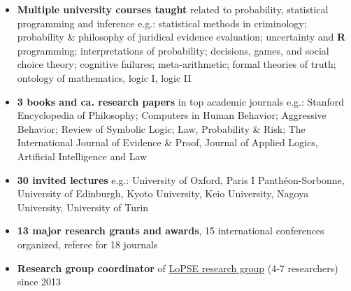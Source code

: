 \documentclass[10pt, a4paper]{article}
\begin{document}
\vspace{-6mm}

\begin{itemize}[leftmargin=*]
	 \setlength{\itemsep}{0pt}\scriptsize
	\item \normalsize  \textbf{Multiple university courses taught} related to probability, statistical programming and inference
	\newline
	\scriptsize e.g.: statistical methods in criminology; probability \& philosophy of juridical evidence evaluation; uncertainty and \textbf{\textsf{R}} programming; interpretations of probability; decisions, games, and social choice theory; cognitive failures; meta-arithmetic; formal theories of truth; ontology of mathematics, logic I, logic II
	
	\item \normalsize  \textbf{3 books and ca. research papers} in top academic journals\newline
	\scriptsize e.g.: Stanford Encyclopedia of Philosophy; Computers in Human Behavior; Aggressive Behavior; Review of Symbolic Logic; Law, Probability \& Risk; The International Journal of Evidence \& Proof, Journal of Applied Logics, Artificial Intelligence and Law 
	
	\item \normalsize \textbf{30 invited lectures}
	 \newline
	 \scriptsize e.g.: University of Oxford, Paris I Panth\'eon-Sorbonne, University of Edinburgh,   Kyoto University, Keio University, Nagoya University,  University of Turin
	 
	 \vspace{-2mm}	  
	\scriptsize 
	 \item \normalsize  \textbf{13 major research grants and awards}, 15  international conferences organized,   referee for 18  journals
	
	
	\vspace{-2mm} \scriptsize 
	\item \normalsize \textbf{Research group coordinator} of \href{http://lopsegdansk.blogspot.com/p/lopse-team.html}{LoPSE research group} (4-7 researchers) since 2013
		
	
	
\end{itemize}
\thispagestyle{empty}















%
\end{document}
